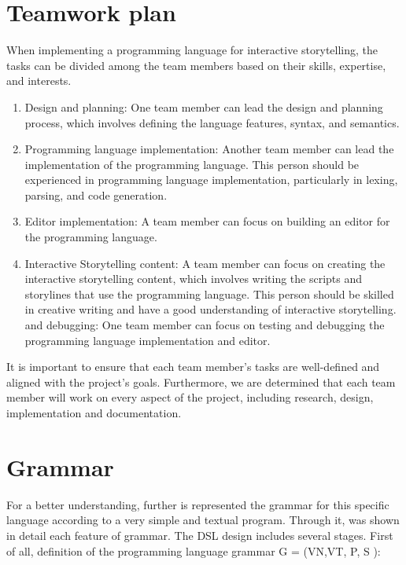 \section{Teamwork plan}
When implementing a programming language for interactive storytelling, the tasks can be divided among the team members based on their skills, expertise, and interests.
 \begin{enumerate}
                 \item Design and planning: One team member can lead the design and planning process, which involves defining the language features, syntax, and semantics. 
                 \item Programming language implementation: Another team member can lead the implementation of the programming language. This person should be experienced in programming language implementation, particularly in lexing, parsing, and code generation.
                 \item Editor implementation: A team member can focus on building an editor for the programming language.
                 \item Interactive Storytelling content: A team member can focus on creating the interactive storytelling content, which involves writing the scripts and storylines that use the programming language. This person should be skilled in creative writing and have a good understanding of interactive storytelling.
                 \itemTesting and debugging: One team member can focus on testing and debugging the programming language implementation and editor. 
 \end{enumerate}
It is important to ensure that each team member's tasks are well-defined and aligned with the project's goals. Furthermore, we are determined that each team member will work on every aspect of the project, including research, design, implementation and documentation. 

\section{Grammar}

\noindent For a better understanding, further is represented the grammar for this specific language according to a very simple and textual program. Through it, was shown in detail each feature of grammar.
The DSL design includes several stages. First of all, definition of the programming
language grammar  
G = (VN,VT, P, S ):

